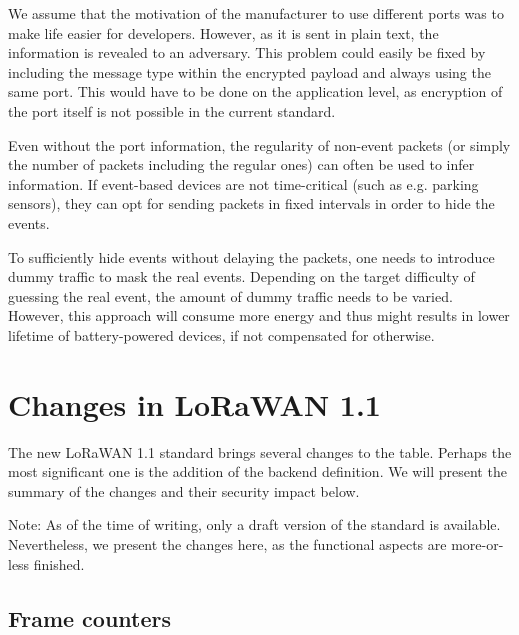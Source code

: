{We assume that the motivation of the manufacturer to use different
ports was to make life easier for developers. However, as it is sent in
plain text, the information is revealed to an adversary. This
problem could easily be fixed by including the message type within the
encrypted payload and always using the same port. This would have to be
done on the application level, as encryption of the port itself is not
possible in the current standard.}

Even without the port information, the regularity of non-event packets (or simply the number of packets including the regular ones) can often be used to infer information. If event-based devices are not time-critical (such as e.g. parking
sensors), they can opt for sending packets in fixed intervals in order to
hide the events.

To sufficiently hide events without delaying the packets, one needs to introduce dummy traffic to mask the real events.
Depending on the target difficulty of guessing the real event, the amount of dummy
traffic needs to be varied. However, this approach will consume more energy and thus might
results in lower lifetime of battery-powered devices, if not compensated for otherwise.

\chapter{Changes in LoRaWAN 1.1}\label{h.6snn4dp8j73u}

The new LoRaWAN 1.1 standard brings several changes to the table. Perhaps the most significant one is the addition of the
backend definition. We will present the summary of the changes and their security impact below.

Note: As of the time of writing, only a draft version of the standard is available. Nevertheless, we present the changes here, as the functional aspects are more-or-less finished.

\hypertarget{h.jpbc1i7c9eqd}{\section{\texorpdfstring{{Frame
counters}}{Frame counters}}\label{h.jpbc1i7c9eqd}}

